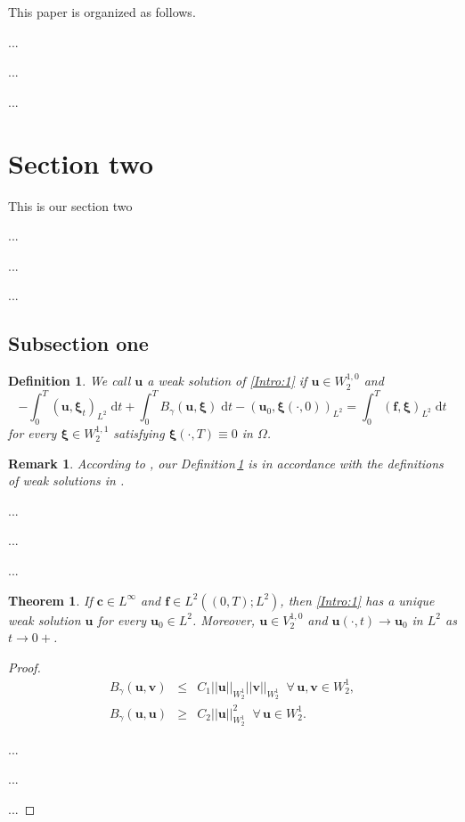 \documentclass[twoside,10pt]{article}
\newtheorem{theorem}{\bf Theorem}[section]
\newtheorem{definition}{\bf Definition}[section]
\newtheorem{remark}{\bf Remark}[section]
\numberwithin{equation}{section}
\newcommand{\bsu}{{\boldsymbol{u}}}
\newcommand{\bsv}{\boldsymbol{v}}
\newcommand{\bsf}{\boldsymbol{f}}
\newcommand{\dt}{{\mathrm d}t}
\newcommand{\bsc}{\boldsymbol{c}}
\begin{document}
This paper is organized as follows.

...

...

...


\section{Section two}

This is our section two

...

...

...



\subsection{Subsection one}\label{subsec:} 




\begin{definition}\label{def:1}
We call $\bsu$  a weak solution of \eqref{Intro:1} if $\bsu\in W_{2}^{1,0}$ and
	\begin{equation}
		-\int _0^T (\bsu,\boldsymbol{\xi}_t)_{L^2}\; \dt  + \int_0^T B_\gamma (\bsu,\boldsymbol{\xi}) \; \dt - (\bsu_0,\boldsymbol{\xi}(\cdot,0))_{L^2}= \int _0 ^T (\bsf,\boldsymbol{\xi})_{L^2}\;\dt
	\end{equation}
	for every  $\boldsymbol{\xi}\in W_2^{1,1}$ satisfying $\boldsymbol{\xi}(\cdot,T)\equiv 0$ in $\Omega$.
\end{definition}

\begin{remark}{\rm According to \cite[Theorem\,2]{Chen2001},
	our Definition\,\ref{def:1} is in accordance with the definitions of weak solutions in  \cite[Definition\,2.1 and (16)]{Chen2001}.}
\end{remark}

...

...

...

\begin{theorem}\label{existence:1}
	If $\bsc\in L^\infty$ and $\bsf\in L^2((0,T);L^2)$,
	then \eqref{Intro:1} has a unique weak solution $\bsu$ for every $\bsu_0\in L^2$. Moreover,
	 $\bsu\in V^{1,0}_2$ and $\bsu(\cdot,t)\to \bsu_0$ in $L^2$ as $t\to 0+$.
\end{theorem}



\begin{proof}
	
	\begin{eqnarray}
		B_\gamma (\bsu,\bsv)&\le& C_1 ||\bsu||_{W_2^1}||\bsv||_{W_2^1}\;\;\forall\, \bsu,\bsv\in W_2^1,\label{1127}\\
		B_\gamma(\bsu,\bsu)&\ge& C_2 ||\bsu||_{W_2^1}^2\;\;\forall\, \bsu\in W_2^1.\label{1128}
	\end{eqnarray}

...

...

...
	
	

\end{proof}
\end{document}
